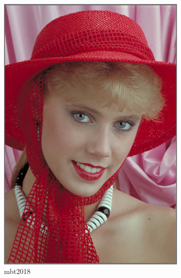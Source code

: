 \begin{figure}[t!]
\begin{subfigure}[]{0.25\textwidth}
        \includegraphics[width=\textwidth]{Immagini/IMAGES/mbt2018_3_IMG0004.pdf}
        \caption{mbt2018}
        \label{fig:CompressedMbt2018}
    \end{subfigure}
    \hspace{0.5cm}
    \begin{subfigure}[]{0.25\textwidth}

\end{subfigure}
\end{figure}
